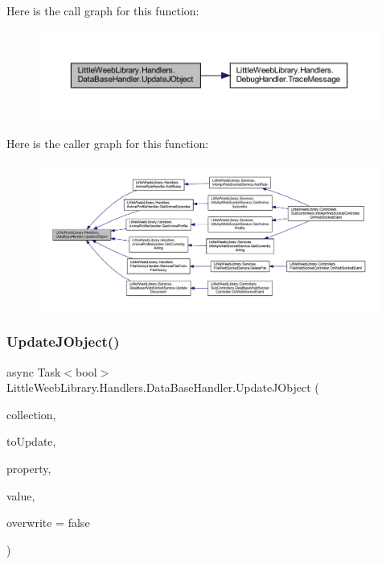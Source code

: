 Here is the call graph for this function\+:\nopagebreak
\begin{figure}[H]
\begin{center}
\leavevmode
\includegraphics[width=350pt]{class_little_weeb_library_1_1_handlers_1_1_data_base_handler_a9b2223ff71f688234f95d247ea3b5739_cgraph}
\end{center}
\end{figure}
Here is the caller graph for this function\+:\nopagebreak
\begin{figure}[H]
\begin{center}
\leavevmode
\includegraphics[width=350pt]{class_little_weeb_library_1_1_handlers_1_1_data_base_handler_a9b2223ff71f688234f95d247ea3b5739_icgraph}
\end{center}
\end{figure}
\mbox{\label{class_little_weeb_library_1_1_handlers_1_1_data_base_handler_ae1bd1078fc9253555322dc0609c49863}} 
\subsubsection{\texorpdfstring{Update\+J\+Object()}{UpdateJObject()}\hspace{0.1cm}{\footnotesize\ttfamily [2/2]}}
{\footnotesize\ttfamily async Task$<$bool$>$ Little\+Weeb\+Library.\+Handlers.\+Data\+Base\+Handler.\+Update\+J\+Object (\begin{DoxyParamCaption}\item[{string}]{collection,  }\item[{J\+Object}]{to\+Update,  }\item[{string}]{property,  }\item[{string}]{value,  }\item[{bool}]{overwrite = {\ttfamily false} }\end{DoxyParamCaption})}



